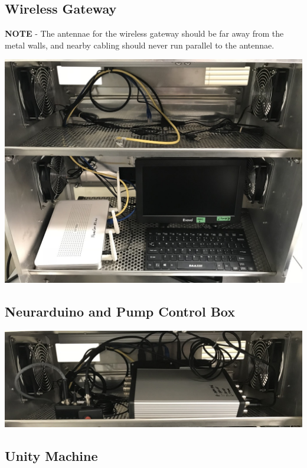 %
%
\clearpage
\subsection{Wireless Gateway}
\label{sect-setup-howto-router}

\textbf{NOTE} - The antennae for the wireless gateway should be far away
from the metal walls, and nearby cabling should never run parallel to the
antennae.

\begin{center}
\includegraphics[width=0.9\columnwidth]
{photos/install-20181106/small-mon-gateway.jpg}
\end{center}

%
%
\clearpage
\subsection{Neurarduino and Pump Control Box}
\label{sect-setup-howto-ard}

\begin{center}
\includegraphics[width=0.9\columnwidth]
{photos/install-20181106/ard-pbox-wiring.jpg}
\end{center}

%
%
\subsection{Unity Machine}
\label{sect-setup-howto-unity}

